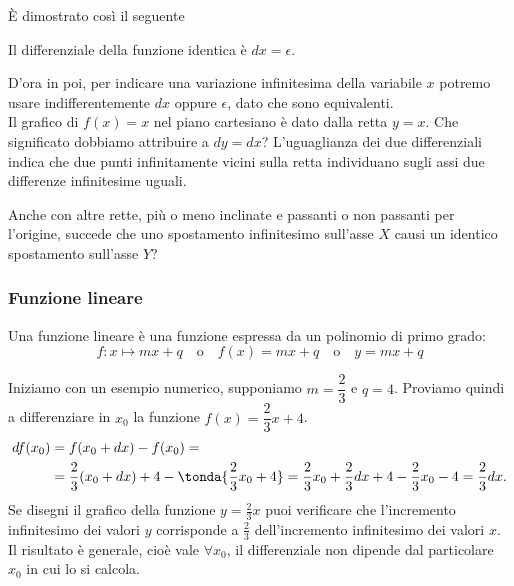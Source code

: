 \begin{inaccessibleblock}
 \begin{center}
 \begin{minipage}[]{.38 \textwidth}
  \rettabisettrice
 \end{minipage} 
 \hfill
 \begin{minipage}[]{.55 \textwidth}
È dimostrato così il seguente
\begin{teorema}
Il differenziale della funzione identica è $dx=\epsilon$.
\end{teorema}
D'ora in poi, per indicare una variazione infinitesima della variabile $x$
potremo usare indifferentemente $dx$ oppure $\epsilon$, dato che
sono equivalenti.\\
Il grafico di $f(x)=x$ nel piano cartesiano è dato dalla retta $y=x$. 
Che significato dobbiamo attribuire a $dy=dx$?
L'uguaglianza dei due differenziali indica che due punti infinitamente
vicini sulla retta individuano sugli assi due differenze infinitesime 
uguali.
 \end{minipage}
 \end{center}
\end{inaccessibleblock}
\label{fig:diff01_diffcostante}
  
Anche con altre rette, più o meno inclinate e passanti o non passanti per 
l'origine, succede che uno spostamento infinitesimo sull'asse $X$ causi 
un identico spostamento sull'asse $Y$?

\subsubsection{Funzione lineare}
\label{subsubsec:diff01_flineare}

Una funzione lineare è una funzione espressa da un polinomio di primo grado:
\[f: x \mapsto mx +q \quad \text{o} \quad 
  f(x)=mx +q \quad \text{o} \quad 
  y = mx +q\]

\begin{esempio}
 Iniziamo con un esempio numerico, supponiamo \(m=\dfrac{2}{3}\) e \(q=4\).
 Proviamo quindi a differenziare in $x_0$ la 
 funzione $f(x)=\dfrac{2}{3}x +4$.
\begin{align*}
df(x_0) &=f(x_0+dx)-f(x_0)=\\
             &=\frac{2}{3}(x_0+dx)+4-\tonda{\frac{2}{3}x_0+4}=
                 \frac{2}{3}x_0+\frac{2}{3}dx+4-\frac{2}{3}x_0-4=
                 \frac{2}{3}dx.
\end{align*}
Se disegni il grafico della funzione $y=\frac{2}{3}x$ puoi verificare che
l'incremento infinitesimo dei valori $y$ corrisponde a $\frac{2}{3}$ 
dell'incremento infinitesimo dei valori $x$. 
Il risultato è generale, cioè vale $\forall x_0$, il differenziale non 
dipende dal particolare $x_0$ in cui lo si calcola.
\end{esempio}

